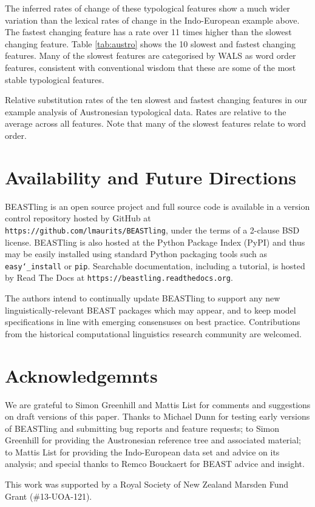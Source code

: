 \documentclass[twocolumn,10pt]{scrartcl}
\begin{document}
The inferred rates of change of these typological features show a much wider variation than the lexical rates of change in the Indo-European example above.  The fastest changing feature has a rate over 11 times higher than the slowest changing feature.  Table \ref{tab:austro} shows the 10 slowest and fastest changing features.  Many of the slowest features are categorised by WALS as word order features, consistent with conventional wisdom that these are some of the most stable typological features.

\begin{table*}[ht]
	\begin{center}
		
	\end{center}
	\caption{Relative substitution rates of the ten slowest and fastest changing features in our example analysis of Austronesian typological data.  Rates are relative to the average across all features.  Note that many of the slowest features relate to word order.}
\label{tab:austro}
\end{table*}

\section{Availability and Future Directions}

BEASTling is an open source project and full source code is available in a version control repository hosted by GitHub at \texttt{https://github.com/lmaurits/BEASTling}, under the terms of a 2-clause BSD license.  BEASTling is also hosted at the Python Package Index (PyPI) and thus may be easily installed using standard Python packaging tools such as \texttt{easy\char`_install} or \texttt{pip}.  Searchable documentation, including a tutorial, is hosted by Read The Docs at \texttt{https://beastling.readthedocs.org}.

The authors intend to continually update BEASTling to support any new linguistically-relevant BEAST packages which may appear, and to keep model specifications in line with emerging consensuses on best practice.  Contributions from the historical computational linguistics research community are welcomed.

\section{Acknowledgemnts}

We are grateful to Simon Greenhill and Mattis List for comments and suggestions on draft versions of this paper.  Thanks to Michael Dunn for testing early versions of BEASTling and submitting bug reports and feature requests; to Simon Greenhill for providing the Austronesian reference tree and associated material; to Mattis List for providing the Indo-European data set and advice on its analysis; and special thanks to Remco Bouckaert for BEAST advice and insight.

This work was supported by a Royal Society of New Zealand Marsden Fund Grant (\#13-UOA-121).




\end{document}
